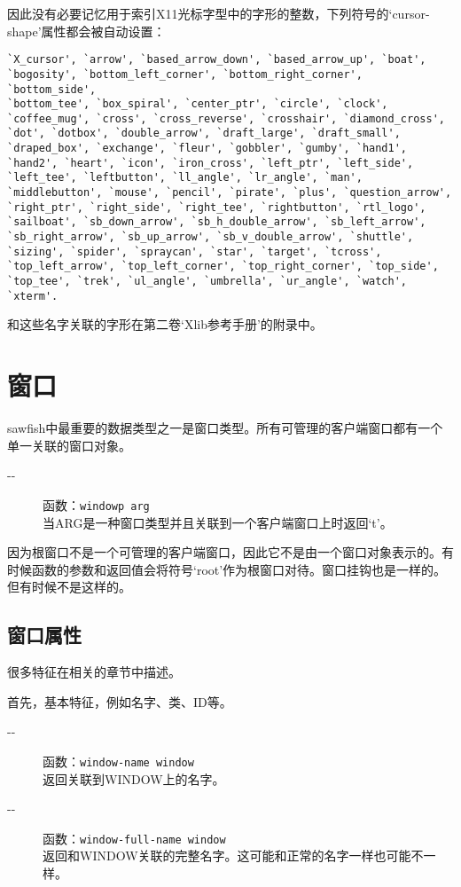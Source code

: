\documentclass{book}
\begin{document}
\begin{CJK*}{UTF8}{gbsn}
因此没有必要记忆用于索引X11光标字型中的字形的整数，下列符号的`cursor-shape'属性都会被自动设置：
\begin{verbatim}
`X_cursor', `arrow', `based_arrow_down', `based_arrow_up', `boat',
`bogosity', `bottom_left_corner', `bottom_right_corner', `bottom_side',
`bottom_tee', `box_spiral', `center_ptr', `circle', `clock',
`coffee_mug', `cross', `cross_reverse', `crosshair', `diamond_cross',
`dot', `dotbox', `double_arrow', `draft_large', `draft_small',
`draped_box', `exchange', `fleur', `gobbler', `gumby', `hand1',
`hand2', `heart', `icon', `iron_cross', `left_ptr', `left_side',
`left_tee', `leftbutton', `ll_angle', `lr_angle', `man',
`middlebutton', `mouse', `pencil', `pirate', `plus', `question_arrow',
`right_ptr', `right_side', `right_tee', `rightbutton', `rtl_logo',
`sailboat', `sb_down_arrow', `sb_h_double_arrow', `sb_left_arrow',
`sb_right_arrow', `sb_up_arrow', `sb_v_double_arrow', `shuttle',
`sizing', `spider', `spraycan', `star', `target', `tcross',
`top_left_arrow', `top_left_corner', `top_right_corner', `top_side',
`top_tee', `trek', `ul_angle', `umbrella', `ur_angle', `watch', `xterm'.
\end{verbatim}

和这些名字关联的字形在第二卷`Xlib参考手册'的附录\uppercase\expandafter{}中。
\chapter{窗口}
sawfish中最重要的数据类型之一是窗口类型。所有可管理的客户端窗口都有一个单一关联的窗口对象。
\begin{description}
\item[-{}-] 函数：\verb|windowp arg|\\
当ARG是一种窗口类型并且关联到一个客户端窗口上时返回`t'。
\end{description}

因为根窗口不是一个可管理的客户端窗口，因此它不是由一个窗口对象表示的。有时候函数的参数和返回值会将符号`root'作为根窗口对待。窗口挂钩也是一样的。但有时候不是这样的。
\section{窗口属性}
很多特征在相关的章节中描述。

首先，基本特征，例如名字、类、ID等。
\begin{description}
\item[-{}-] 函数：\verb|window-name window|\\
返回关联到WINDOW上的名字。
\item[-{}-] 函数：\verb|window-full-name window|\\
返回和WINDOW关联的完整名字。这可能和正常的名字一样也可能不一样。
\end{description}


\end{CJK*}
\end{document}
